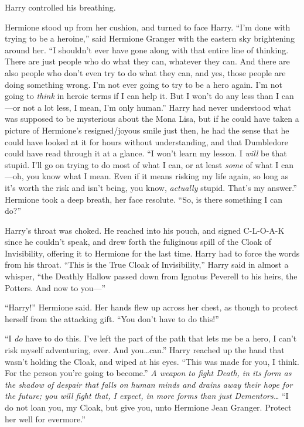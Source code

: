 Harry controlled his breathing.

Hermione stood up from her cushion, and turned to face Harry. “I’m done with trying to be a heroine,” said Hermione Granger with the eastern sky brightening around her. “I shouldn’t ever have gone along with that entire line of thinking. There are just people who do what they can, whatever they can. And there are also people who don’t even try to do what they can, and yes, those people are doing something wrong. I’m not ever going to try to be a hero again. I’m not going to \emph{think} in heroic terms if I can help it. But I won’t do any less than I can—or not a lot less, I mean, I’m only human.” Harry had never understood what was supposed to be mysterious about the Mona Lisa, but if he could have taken a picture of Hermione’s resigned/joyous smile just then, he had the sense that he could have looked at it for hours without understanding, and that Dumbledore could have read through it at a glance. “I won’t learn my lesson. I \emph{will} be that stupid. I’ll go on trying to do most of what I can, or at least \emph{some} of what I can—oh, you know what I mean. Even if it means risking my life again, so long as it’s worth the risk and isn’t being, you know, \emph{actually} stupid. That’s my answer.” Hermione took a deep breath, her face resolute. “So, is there something I can do?”

Harry’s throat was choked. He reached into his pouch, and signed C-L-O-A-K since he couldn’t speak, and drew forth the fuliginous spill of the Cloak of Invisibility, offering it to Hermione for the last time. Harry had to force the words from his throat. “This is the True Cloak of Invisibility,” Harry said in almost a whisper, “the Deathly Hallow passed down from Ignotus Peverell to his heirs, the Potters. And now to you—”

“Harry!” Hermione said. Her hands flew up across her chest, as though to protect herself from the attacking gift. “You don’t have to do this!”

“I \emph{do} have to do this. I’ve left the part of the path that lets me be a hero, I can’t risk myself adventuring, ever. And you…can.” Harry reached up the hand that wasn’t holding the Cloak, and wiped at his eyes. “This was made for you, I think. For the person you’re going to become.” \emph{A weapon to fight Death, in its form as the shadow of despair that falls on human minds and drains away their hope for the future; you will fight that, I expect, in more forms than just Dementors…} “I do not loan you, my Cloak, but give you, unto Hermione Jean Granger. Protect her well for evermore.”

